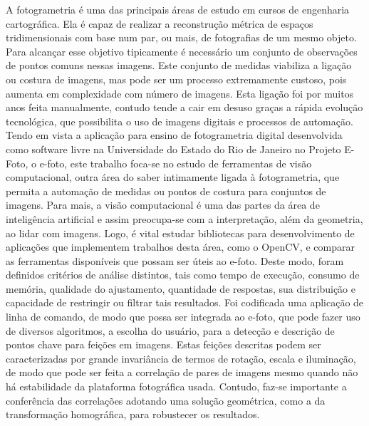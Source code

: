 
\fazreferencia


A fotogrametria é uma das principais áreas de estudo em cursos de engenharia cartográfica. Ela é capaz de realizar a reconstrução métrica de espaços tridimensionais com base num par, ou mais, de fotografias de um mesmo objeto.
Para alcançar esse objetivo tipicamente é necessário um conjunto de observações de pontos comuns nessas imagens.
Este conjunto de medidas viabiliza a ligação ou costura de imagens, mas pode ser um processo extremamente custoso, pois aumenta em complexidade com número de imagens. Esta ligação foi por muitos anos feita manualmente, contudo tende a cair em desuso graças a rápida evolução tecnológica, que possibilita o uso de imagens digitais e processos de automação. 
Tendo em vista a aplicação para ensino de fotogrametria digital desenvolvida como software livre na Universidade do Estado do Rio de Janeiro no Projeto E-Foto, o e-foto, este trabalho foca-se no estudo de ferramentas de visão computacional, outra área do saber intimamente ligada à fotogrametria, que permita a automação de medidas ou pontos de costura para conjuntos de imagens. Para mais, a visão computacional é uma das partes da área de inteligência artificial e assim preocupa-se com a interpretação, além da geometria, ao lidar com imagens.
Logo, é vital estudar bibliotecas para desenvolvimento de aplicações que implementem trabalhos desta área, como o OpenCV, e comparar as ferramentas disponíveis que possam ser úteis ao e-foto. Deste modo, foram definidos critérios de análise distintos, tais como tempo de execução, consumo de memória, qualidade do ajustamento, quantidade de respostas, sua distribuição e capacidade de restringir ou filtrar tais resultados. Foi codificada uma aplicação de linha de comando, de modo que possa ser integrada ao e-foto, que pode fazer uso de diversos algoritmos, a escolha do usuário, para a detecção e descrição de pontos chave para feições em imagens. Estas feições descritas podem ser caracterizadas por grande invariância de termos de rotação, escala e iluminação, de modo que pode ser feita a correlação de pares de imagens mesmo quando não há estabilidade da plataforma fotográfica usada. Contudo, faz-se importante a conferência das correlações adotando uma solução geométrica, como a da transformação homográfica, para robustecer os resultados.

